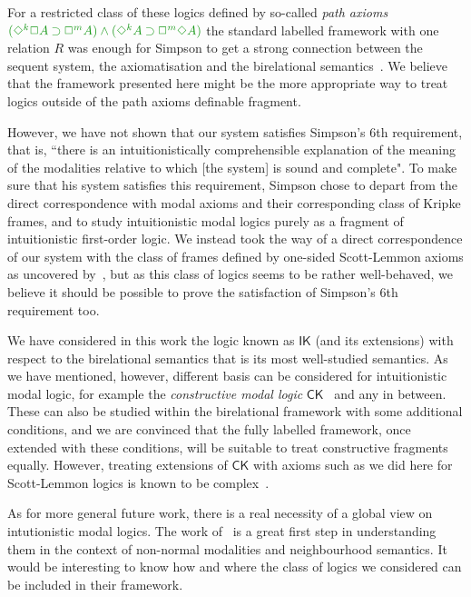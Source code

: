 \documentclass[a4paper]{article}
\theoremstyle{plain}
\theoremstyle{definition}
\newcommand*{\IK}{\mathsf{IK}}
\newcommand*{\AND}{\mathbin{\wedge}}
\newcommand*{\IMP}{\mathbin{\supset}}%
\newcommand*{\BOX}{\mathord{\Box}}
\newcommand*{\DIA}{\mathord{\Diamond}}
\newcommand*{\fm}[1]{{\color{notgreen}{#1}}}
\begin{document}
For a restricted class of these logics defined by so-called \emph{path axioms} $\fm{(\DIA^k\BOX A \IMP\BOX^m A) \AND (\DIA^k A \IMP \BOX^m\DIA A)}$ the standard labelled framework with one relation $R$ was enough for Simpson to get a strong connection between the sequent system, the axiomatisation and the birelational semantics~\cite{simpson:phd}.
%
%
We believe that the framework presented here might be the more appropriate way to treat logics outside of the path axioms definable fragment.

However, we have not shown that our system satisfies Simpson's 6th requirement, that is, ``there is an intuitionistically comprehensible explanation of the meaning of the modalities relative to which [the system] is sound and complete".
%
To make sure that his system satisfies this requirement, Simpson chose to depart from the direct correspondence with modal axioms and their corresponding class of Kripke frames, and to study intuitionistic modal logics purely as a fragment of intuitionistic first-order logic.
%
We instead took the way of a direct correspondence of our system with the class of frames defined by one-sided Scott-Lemmon axioms as uncovered by~\cite{plotkin:stirling:86}, but as this class of logics seems to be rather well-behaved, we believe it should be possible to prove the satisfaction of Simpson's 6th requirement too.

We have considered in this work the logic known as $\IK$ (and its extensions) with respect to the birelational semantics that is its most well-studied semantics.
%
As we have mentioned, however, different basis can be considered for intuitionistic modal logic, for example the \emph{constructive modal logic} $\mathsf{CK}$~\cite{bierman:depaiva:sl00,mendler:scheele:ic11} and any in between.
%
These can also be studied within the birelational framework with some additional conditions, and we are convinced that the fully labelled framework, once extended with these conditions, will be suitable to treat constructive fragments equally.
%
However, treating extensions of $\mathsf{CK}$ with axioms such as we did here for Scott-Lemmon logics is known to be complex~\cite{arisaka:etal:lmcs15}.

As for more general future work, there is a real necessity of a global view on intutionistic modal logics.
%
The work of~\cite{dalmonte:grellois:olivetti:JPL2020} is a great first step in understanding them in the context of non-normal modalities and neighbourhood semantics.
%
It would be interesting to know how and where the class of logics we considered can be included in their framework.



 
 
 
\end{document}
